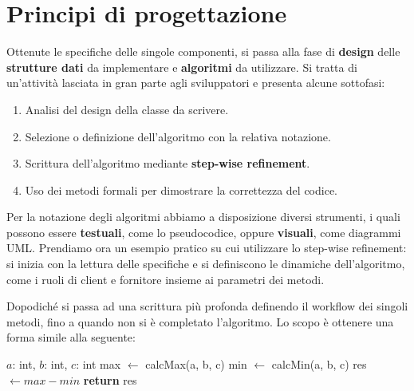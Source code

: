 %

\section{Principi di progettazione}
Ottenute le specifiche delle singole componenti, si passa alla fase di \textbf{design} delle \textbf{strutture dati} da implementare e
\textbf{algoritmi} da utilizzare. Si tratta di un'attività lasciata in gran parte agli sviluppatori e presenta alcune sottofasi: \begin{enumerate}
	\item Analisi del design della classe da scrivere.
	\item Selezione o definizione dell'algoritmo con la relativa notazione.
	\item Scrittura dell'algoritmo mediante \textbf{step-wise refinement}.
	\item Uso dei metodi formali per dimostrare la correttezza del codice.
\end{enumerate}
\noindent Per la notazione degli algoritmi abbiamo a disposizione diversi strumenti, i quali possono essere \textbf{testuali}, come lo pseudocodice,
oppure \textbf{visuali}, come diagrammi UML. Prendiamo ora un esempio pratico su cui utilizzare lo step-wise refinement: si inizia con la lettura delle
specifiche e si definiscono le dinamiche dell'algoritmo, come i ruoli di client e fornitore insieme ai parametri dei metodi.\par
Dopodiché si passa ad una scrittura più profonda definendo il workflow dei singoli metodi, fino a quando non si è completato l'algoritmo. Lo scopo è
ottenere una forma simile alla seguente: \begin{algorithm}[h]
	\caption{getMax(a, b, c)}
	\begin{algorithmic}[i]
		\Require $a$: int, $b$: int, $c$: int
		\State max $\gets$ calcMax(a, b, c)
		\State min $\gets$ calcMin(a, b, c)
		\State res $\gets max-min$
		\State \textbf{return} res
	\end{algorithmic}
\end{algorithm}

